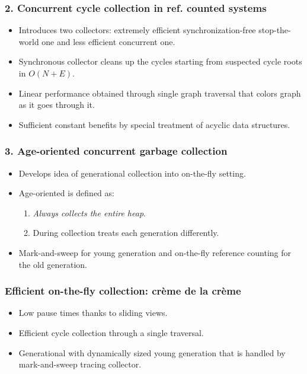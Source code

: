 \begin{frame}
    \frametitle{2. Concurrent cycle collection in ref. counted systems}
    \begin{itemize}
        \item
            Introduces two collectors: extremely efficient synchronization-free
            stop-the-world one and less efficient concurrent one.
        \item
            Synchronous collector cleans up the cycles starting from suspected
            cycle roots in $O(N + E)$.
        \item
            Linear performance obtained through single graph traversal
            that colors graph as it goes through it.
        \item
            Sufficient constant benefits by special treatment of acyclic
            data structures.
    \end{itemize}
\end{frame}

\begin{frame}
    \frametitle{3. Age-oriented concurrent garbage collection}
    \begin{itemize}
        \item
            Develops idea of generational collection into on-the-fly setting.
        \item
            Age-oriented is defined as:
            \begin{enumerate}
                \item \textit{Always collects the entire heap}.
                \item During collection treats each generation differently.
            \end{enumerate}
        \item
            Mark-and-sweep for young generation and on-the-fly reference
            counting for the old generation.
    \end{itemize}
\end{frame}

\begin{frame}
    \frametitle{Efficient on-the-fly collection: cr\`eme de la cr\`eme}
    \begin{itemize}
        \item
            Low pause times thanks to sliding views.
        \item
            Efficient cycle collection through a single traversal.
        \item
            Generational with dynamically sized young generation
            that is handled by mark-and-sweep tracing collector.
    \end{itemize}
\end{frame}

